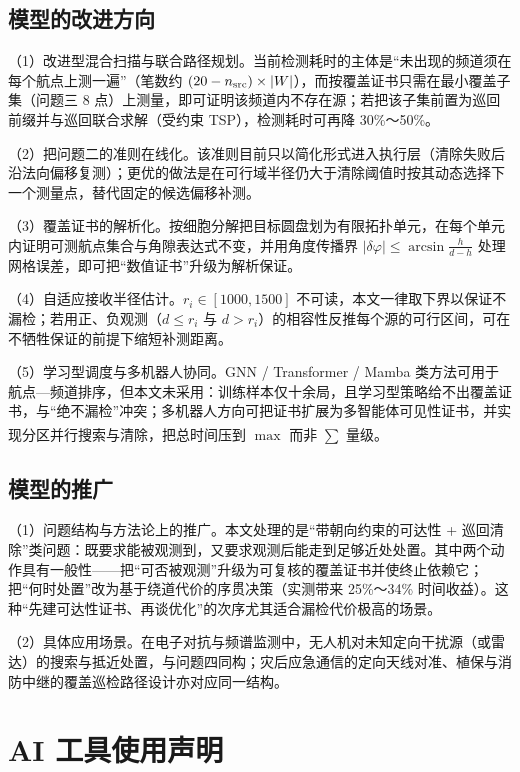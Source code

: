 \documentclass[12pt,a4paper]{ctexart}
\newcommand{\upcite}[1]{\textsuperscript{\cite{#1}}}
\begin{document}
\subsection{模型的改进方向}

（1）改进型混合扫描与联合路径规划。当前检测耗时的主体是“未出现的频道须在每个航点上测一遍”（笔数约 $(20-n_{\rm src})\times|W|$），而按覆盖证书只需在最小覆盖子集（问题三 8 点）上测量，即可证明该频道内不存在源；若把该子集前置为巡回前缀并与巡回联合求解（受约束 TSP），检测耗时可再降 30\%～50\%。

（2）把问题二的准则在线化。该准则目前只以简化形式进入执行层（清除失败后沿法向偏移复测）；更优的做法是在可行域半径仍大于清除阈值时按其动态选择下一个测量点，替代固定的候选偏移补测。

（3）覆盖证书的解析化。按细胞分解把目标圆盘划为有限拓扑单元，在每个单元内证明可测航点集合与角隙表达式不变，并用角度传播界 $|\delta\varphi|\le\arcsin\frac{h}{d-h}$ 处理网格误差，即可把“数值证书”升级为解析保证。

（4）自适应接收半径估计。$r_i\in[1000,1500]$ 不可读，本文一律取下界以保证不漏检；若用正、负观测（$d\le r_i$ 与 $d>r_i$）的相容性反推每个源的可行区间，可在不牺牲保证的前提下缩短补测距离。

（5）学习型调度与多机器人协同。GNN / Transformer / Mamba 类方法可用于航点—频道排序，但本文未采用：训练样本仅十余局，且学习型策略给不出覆盖证书，与“绝不漏检”冲突；多机器人方向可把证书扩展为多智能体可见性证书，并实现分区并行搜索与清除，把总时间压到 $\max$ 而非 $\sum$ 量级\upcite{ref:Foster2023}。

\subsection{模型的推广}

（1）问题结构与方法论上的推广。本文处理的是“带朝向约束的可达性 + 巡回清除”类问题：既要求能被观测到，又要求观测后能走到足够近处处置。其中两个动作具有一般性——把“可否被观测”升级为可复核的覆盖证书并使终止依赖它；把“何时处置”改为基于绕道代价的序贯决策（实测带来 25\%～34\% 时间收益）。这种“先建可达性证书、再谈优化”的次序尤其适合漏检代价极高的场景。

（2）具体应用场景。在电子对抗与频谱监测中，无人机对未知定向干扰源（或雷达）的搜索与抵近处置，与问题四同构；灾后应急通信的定向天线对准、植保与消防中继的覆盖巡检路径设计亦对应同一结构。


\section*{AI 工具使用声明}
\end{document}
